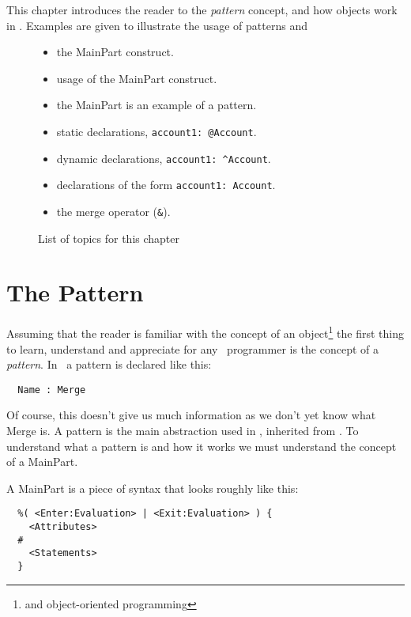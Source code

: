 This chapter introduces the reader to the \emph{pattern} concept, and
how objects work in \gbeta . Examples are given to illustrate the
usage of patterns and 

\begin{figure}[h!]
\caption{List of topics for this chapter}
\begin{itemize}\setlength{\itemsep}{-5pt}
\item the \textsf{MainPart} construct.
\item usage of the \textsf{MainPart} construct.
\item the \textsf{MainPart} is an example of a pattern.
\item static declarations, \verb|account1: @Account|.
\item dynamic declarations, \verb|account1: ^Account|.
\item declarations of the form \verb|account1: Account|.
\item the merge operator (\verb|&|).
\end{itemize}
\end{figure}

\section{The Pattern}

Assuming that the reader is familiar with the concept of an
object\footnote{and object-oriented programming} the first thing to
learn, understand and appreciate for any \gbeta\ programmer is the
concept of a \emph{pattern}. In \gbeta\ a pattern is declared like
this:
\begin{verbatim}
  Name : Merge
\end{verbatim}
Of course, this doesn't give us much information as we don't yet know
what \textsf{Merge} is. A pattern is the main abstraction used in
\gbeta , inherited from \beta . To understand what a pattern is and
how it works we must understand the concept of a
\textsf{MainPart}.

A \textsf{MainPart} is a piece of syntax that looks roughly like this:
\begin{verbatim}
  %( <Enter:Evaluation> | <Exit:Evaluation> ) {
    <Attributes>
  #
    <Statements>
  }
\end{verbatim}

